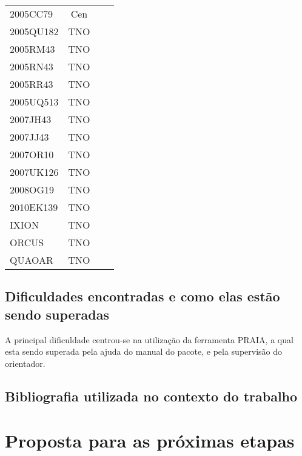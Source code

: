 \documentclass[a4paper, 11pt]{article}
\begin{document}
\begin{table}[!h]
\begin{center}
{\begin{tabular}{|l|c|c|c|}
2005CC79    &  Cen &      &    \\
2005QU182   &  TNO &      &    \\
2005RM43    &  TNO &      &    \\
2005RN43    &  TNO &      &    \\
2005RR43    &  TNO &      &    \\
2005UQ513   &  TNO &      &    \\
2007JH43    &  TNO &      &    \\
2007JJ43    &  TNO &      &    \\
2007OR10    &  TNO &      &    \\
2007UK126   &  TNO &      &    \\
2008OG19    &  TNO &      &    \\
2010EK139   &  TNO &      &    \\
IXION       &  TNO &      &    \\
ORCUS       &  TNO &      &    \\
QUAOAR      &  TNO &      &    \\
\hline
\end{tabular}}
\label{table:incerteza}
\end{center}
\end{table}

\subsection{Dificuldades encontradas e como elas estão sendo superadas}
A principal dificuldade centrou-se na utilização da ferramenta PRAIA, a qual esta sendo superada pela ajuda do manual do pacote, e pela supervisão do orientador.  

\subsection{Bibliografia utilizada no contexto do trabalho}

\section{Proposta para as próximas etapas}
\end{document}
